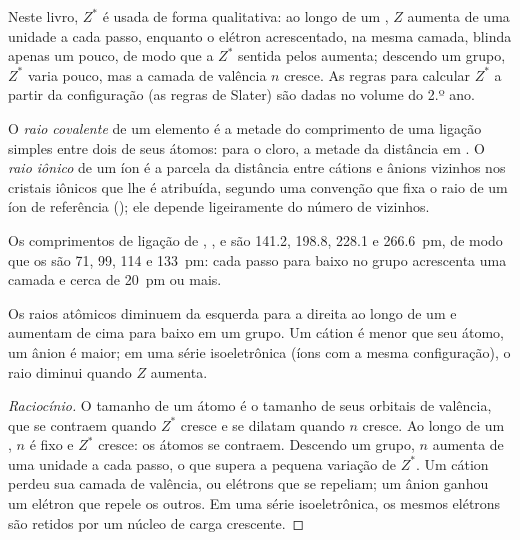 \begin{remark}\label{rem:b1:periodicity:slater}
Neste livro, $Z^{*}$ é usada de forma qualitativa: ao longo de um
, $Z$ aumenta de uma unidade a cada passo, enquanto o elétron
acrescentado, na mesma camada, blinda apenas um pouco, de modo que a
$Z^{*}$ sentida pelos  aumenta; descendo um grupo,
$Z^{*}$ varia pouco, mas a camada de valência
$n$ cresce. As regras para calcular $Z^{*}$ a partir da configuração (as
regras de Slater) são dadas no volume do 2.º ano.
\end{remark}

\begin{definition}\label{def:b1:periodicity:radius}
O \emph{raio covalente} de um elemento é a metade
do comprimento de uma ligação simples entre dois de seus átomos: para o
cloro, a metade da distância  em . O \emph{raio
iônico} de um íon é a parcela da distância
entre cátions e ânions vizinhos nos cristais iônicos que lhe é
atribuída, segundo uma convenção que fixa o raio de um íon de referência
(); ele depende ligeiramente do número de vizinhos.
\end{definition}

\begin{example}[Os halogênios]\label{ex:b1:periodicity:halogen-radii}
Os comprimentos de ligação de , ,  e  são 141.2,
198.8, 228.1 e \qty{266.6}{pm}, de modo que os  são 71, 99, 114
e \qty{133}{pm}: cada passo para baixo no grupo acrescenta uma camada e cerca de
\qty{20}{pm} ou mais.
\end{example}

\begin{proposition}\label{prop:b1:periodicity:radius-trend}
Os raios atômicos diminuem da esquerda para a direita ao longo de um
 e aumentam de cima para baixo em um grupo. Um cátion é menor que
seu átomo, um ânion é maior; em uma série isoeletrônica (íons com a mesma
configuração), o raio diminui quando $Z$ aumenta.
\end{proposition}

\begin{proof}[Raciocínio]
O tamanho de um átomo é o tamanho de seus orbitais de valência, que se
contraem quando $Z^{*}$ cresce e se dilatam quando $n$ cresce. Ao longo
de um , $n$ é fixo e $Z^{*}$ cresce: os átomos se contraem.
Descendo um grupo, $n$ aumenta de uma unidade a cada passo, o que supera
a pequena variação de $Z^{*}$. Um cátion perdeu sua camada de valência,
ou elétrons que se repeliam; um ânion ganhou um elétron que repele os
outros. Em uma série isoeletrônica, os mesmos elétrons são retidos por
um núcleo de carga crescente.
\end{proof}

